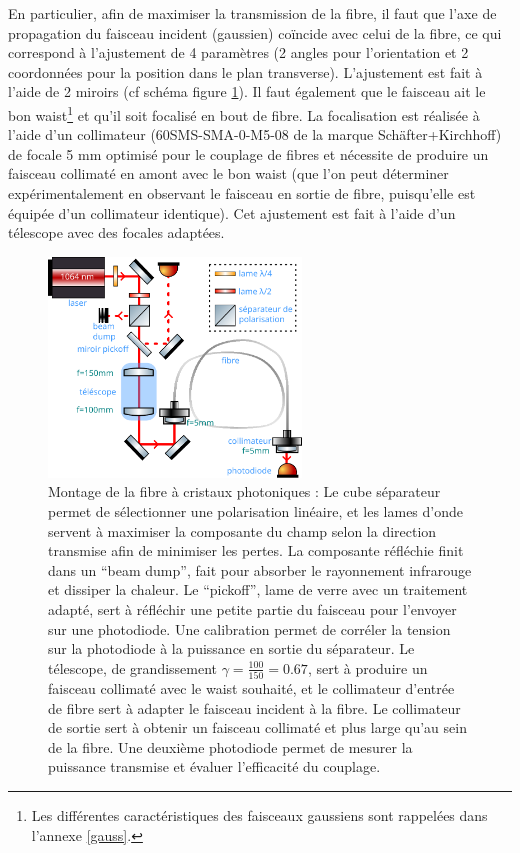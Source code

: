 \documentclass[11pt,a4paper]{article}
\begin{document}
En particulier, afin de maximiser la transmission de la fibre, il faut que l'axe de propagation du faisceau incident (gaussien) coïncide avec celui de la fibre, ce qui correspond à l'ajustement de 4 paramètres (2 angles pour l'orientation et 2 coordonnées pour la position dans le plan transverse). L'ajustement est fait à l'aide de 2 miroirs (cf schéma figure \ref{fig:couplage}). Il faut également que le faisceau ait le bon waist\footnote{Les différentes caractéristiques des faisceaux gaussiens sont rappelées dans l'annexe \ref{gauss}.} et qu'il soit focalisé en bout de fibre. La focalisation est réalisée à l'aide d'un collimateur (60SMS-SMA-0-M5-08 de la marque Schäfter+Kirchhoff) de focale 5 mm optimisé pour le couplage de fibres et nécessite de produire un faisceau collimaté en amont avec le bon waist (que l'on peut déterminer expérimentalement en observant le faisceau en sortie de fibre, puisqu'elle est équipée d'un collimateur identique). Cet ajustement est fait à l'aide d'un télescope avec des focales adaptées.

\begin{figure}[h]
	\centering
	\includegraphics[width=0.6\textwidth]{./img/schema couplage.pdf}
	\caption[Montage de la fibre à cristaux photoniques]{Montage de la fibre à cristaux photoniques :
	\small Le cube séparateur permet de sélectionner une polarisation linéaire, et les lames d'onde servent à maximiser la composante du champ selon la direction transmise afin de minimiser les pertes. La composante réfléchie finit dans un ``beam dump'', fait pour absorber le rayonnement infrarouge et dissiper la chaleur. Le ``pickoff'', lame de verre avec un traitement adapté, sert à réfléchir une petite partie du faisceau pour l'envoyer sur une photodiode. Une calibration permet de corréler la tension sur la photodiode à la puissance en sortie du séparateur. Le télescope, de grandissement $\gamma = \frac{100}{150} = 0.67$, sert à produire un faisceau collimaté avec le waist souhaité, et le collimateur d'entrée de fibre sert à adapter le faisceau incident à la fibre. Le collimateur de sortie sert à obtenir un faisceau collimaté et plus large qu'au sein de la fibre. Une deuxième photodiode permet de mesurer la puissance transmise et évaluer l'efficacité du couplage.}
	\label{fig:couplage}
\end{figure}
\end{document}
